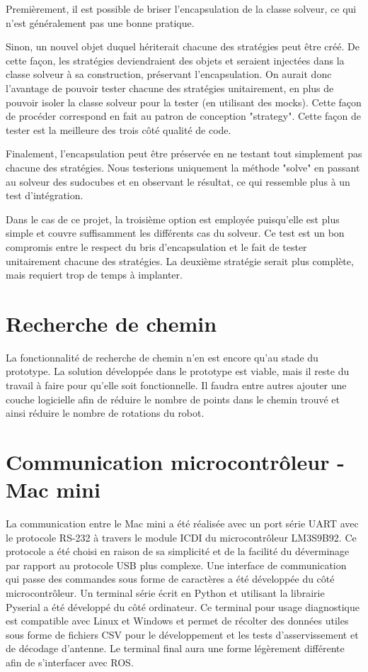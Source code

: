 Premièrement, il est possible de briser l'encapsulation de la classe solveur, ce qui n'est généralement pas une bonne pratique.

Sinon, un nouvel objet duquel hériterait chacune des stratégies peut être créé. De cette façon, les stratégies deviendraient des objets et seraient injectées dans la classe solveur à sa construction, préservant l'encapsulation. On aurait donc l'avantage de pouvoir tester chacune des stratégies unitairement, en plus de pouvoir isoler la classe solveur pour la tester (en utilisant des mocks). Cette façon de procéder correspond en fait au patron de conception "strategy". Cette façon de tester est la meilleure des trois côté qualité de code.

Finalement, l'encapsulation peut être préservée en ne testant tout simplement pas chacune des stratégies. Nous testerions uniquement la méthode "solve" en passant au solveur des sudocubes et en observant le résultat, ce qui ressemble plus à un test d'intégration.

Dans le cas de ce projet, la troisième option est employée puisqu'elle est plus simple et couvre suffisamment les différents cas du solveur. Ce test est un bon compromis entre le respect du bris d'encapsulation et le fait de tester unitairement chacune des stratégies. La deuxième stratégie serait plus complète, mais requiert trop de temps à implanter.

\section{Recherche de chemin}
La fonctionnalité de recherche de chemin n’en est encore qu’au stade du prototype. La solution développée dans le prototype est viable, mais il reste du travail à faire pour qu'elle soit fonctionnelle. Il faudra entre autres ajouter une couche logicielle afin de réduire le nombre de points dans le chemin trouvé et ainsi réduire le nombre de rotations du robot.

\section{Communication microcontrôleur - Mac mini}

La communication entre le Mac mini a été réalisée avec un port série UART avec le protocole RS-232 à travers le module ICDI du microcontrôleur LM3S9B92. Ce protocole a été choisi en raison de sa simplicité et de la facilité du déverminage par rapport au protocole USB plus complexe. Une interface de communication qui passe des commandes sous forme de caractères a été développée du côté microcontrôleur. Un terminal série écrit en Python et utilisant la librairie Pyserial a été développé du côté ordinateur. Ce terminal pour usage diagnostique est compatible avec Linux et Windows et permet de récolter des données utiles sous forme de fichiers CSV pour le développement et les tests d'asservissement et de décodage d'antenne. Le terminal final aura une forme légèrement différente afin de s'interfacer avec ROS.

